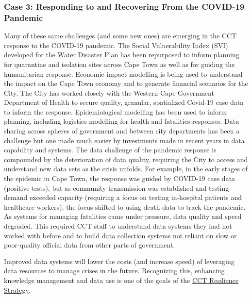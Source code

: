 \hypertarget{case-3-responding-to-and-recovering-from-the-covid-19-pandemic}{%
\subsubsection*{Case 3: Responding to and Recovering From the COVID-19 Pandemic}\label{case-3-responding-to-and-recovering-from-the-covid-19-pandemic}}

Many of these same challenges (and some new ones) are emerging in the CCT response to the COVID-19 pandemic. The Social Vulnerability Index (SVI) developed for the Water Disaster Plan has been repurposed to inform planning for quarantine and isolation sites across Cape Town as well as for guiding the humanitarian response. Economic impact modelling is being used to understand the impact on the Cape Town economy and to generate financial scenarios for the City. The City has worked closely with the Western Cape Government Department of Health to secure quality, granular, spatialized Covid-19 case data to inform the response. Epidemiological modelling has been used to inform planning, including logistics modelling for health and fatalities responses. Data sharing across spheres of government and between city departments has been a challenge but one made much easier by investments made in recent years in data capability and systems. The data challenge of the pandemic response is compounded by the deterioration of data quality, requiring the City to access and understand new data sets as the crisis unfolds. For example, in the early stages of the epidemic in Cape Town, the response was guided by COVID-19 case data (positive tests), but as community transmission was established and testing demand exceeded capacity (requiring a focus on testing in-hospital patients and healthcare workers), the focus shifted to using death data to track the pandemic. As systems for managing fatalities came under pressure, data quality and speed degraded. This required CCT staff to understand data systems they had not worked with before and to build data collection systems not reliant on slow or poor-quality official data from other parts of government.

Improved data systems will lower the costs (and increase speed) of leveraging data resources to manage crises in the future. Recognizing this, enhancing knowledge management and data use is one of the goals of the \href{https://resource.capetown.gov.za/documentcentre/Documents/City\%20strategies\%2C\%20plans\%20and\%20frameworks/Resilience_Strategy.pdf}{CCT Resilience Strategy}.

